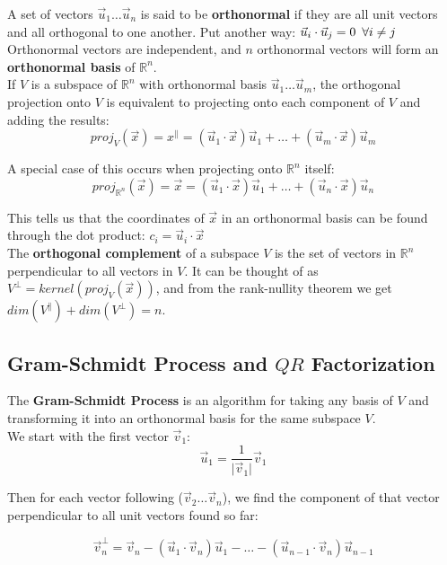 \documentclass[]{scrartcl}
\begin{document}
	A set of vectors $\vec{u}_1 \ldots \vec{u}_n$ is said to be \textbf{orthonormal} if they are all unit vectors and all orthogonal to one another. Put another way: $\vec{u}_i \cdot \vec{u}_j = 0 \enskip \forall i \neq j$\\
	
	Orthonormal vectors are independent, and $n$ orthonormal vectors will form an \textbf{orthonormal basis} of $\mathbb{R}^n$.\\
	
	If $V$ is a subspace of $\mathbb{R}^n$ with orthonormal basis $\vec{u}_1 \ldots \vec{u}_m$, the orthogonal projection onto $V$ is equivalent to projecting onto each component of $V$ and adding the results:
	$$
	proj_V(\vec{x}) = x^\parallel = (\vec{u}_1 \cdot \vec{x})\vec{u}_1 + \ldots + (\vec{u}_m \cdot \vec{x})\vec{u}_m
	$$
	
	A special case of this occurs when projecting onto $\mathbb{R}^n$ itself:
	$$
	proj_{\mathbb{R}^n}(\vec{x}) = \vec{x} = (\vec{u}_1 \cdot \vec{x})\vec{u}_1 + \ldots + (\vec{u}_n \cdot \vec{x})\vec{u}_n
	$$
	
	This tells us that the coordinates of $\vec{x}$ in an orthonormal basis can be found through the dot product: $c_i = \vec{u}_i \cdot \vec{x}$\\
	
	The \textbf{orthogonal complement} of a subspace $V$ is the set of vectors in $\mathbb{R}^n$ perpendicular to all vectors in $V$. It can be thought of as $V^\perp = kernel(proj_V(\vec{x}))$, and from the rank-nullity theorem we get $dim(V^\parallel) + dim(V^\perp) = n$.
	
	\subsection{Gram-Schmidt Process and $QR$ Factorization}
	The \textbf{Gram-Schmidt Process} is an algorithm for taking any basis of $V$ and transforming it into an orthonormal basis for the same subspace $V$.\\
	
	We start with the first vector $\vec{v}_1$:
	$$
	\vec{u}_1 = \frac{1}{\lvert \vec{v}_1 \rvert} \vec{v}_1
	$$
	
	Then for each vector following ($\vec{v}_2 \ldots \vec{v}_n$), we find the component of that vector perpendicular to all unit vectors found so far:
	
	$$
	\vec{v}_{n}^{\perp} = \vec{v}_n - (\vec{u}_1 \cdot \vec{v}_n)\vec{u}_1 - \ldots - (\vec{u}_{n-1} \cdot \vec{v}_n)\vec{u}_{n-1}
	$$
	
\end{document}
